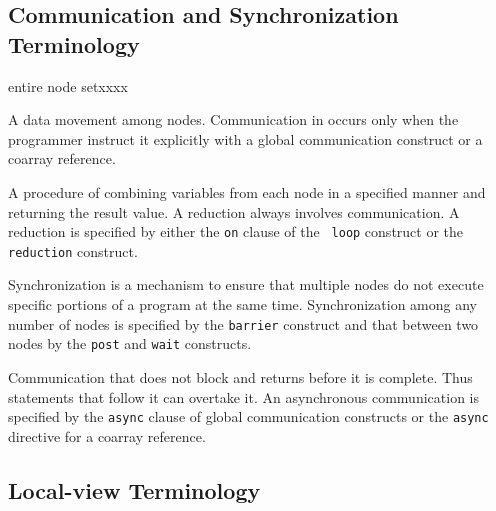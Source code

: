 \subsection{Communication and Synchronization Terminology}

\begin{namelist}{entire node setxxxx}


 A data movement among nodes. Communication in {\XMP} occurs only when
 the programmer instruct it explicitly with a global communication
 construct or a coarray reference.


 A procedure of combining variables from each node in a specified manner
 and returning the result value. A reduction always involves
 communication.
%
 A reduction is specified by either the {\tt on} clause of the {\tt
 loop} construct or the {\tt reduction} construct.


 Synchronization is a mechanism to ensure that multiple nodes do not
 execute specific portions of a program at the same
 time. Synchronization among any number of nodes is specified by the
 {\tt barrier} construct and that between two nodes by the {\tt post} and
 {\tt wait} constructs.


 Communication that does not block and returns before it is
 complete. Thus statements that follow it can overtake it. An
 asynchronous communication is specified by the {\tt async} clause of
 global communication constructs or the {\tt async} directive for
 a coarray reference.

\end{namelist}

\subsection{Local-view Terminology}

